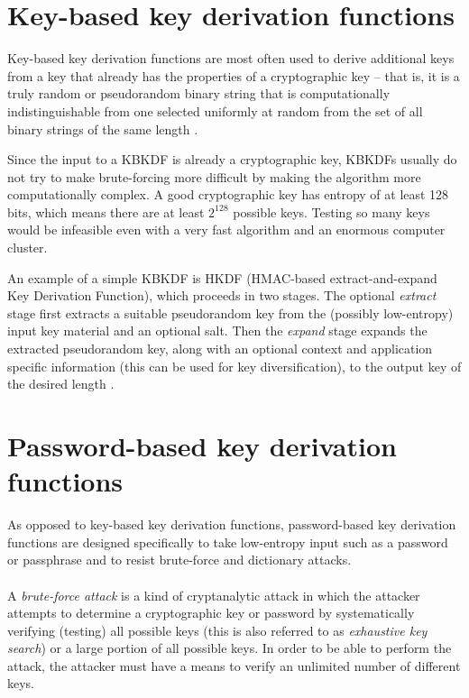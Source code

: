 \documentclass[12pt,oneside]{fithesis2}
\begin{document}
      \section{Key-based key derivation functions}
      Key-based key derivation functions are most often used to derive additional keys from a key that already has the properties of a cryptographic key -- that is, it is a truly random or pseudorandom binary string that is computationally indistinguishable from one selected uniformly at random from the set of all binary strings of the same length \cite{nist:sp800:108}.
      
      Since the input to a KBKDF is already a cryptographic key, KBKDFs usually do not try to make brute-forcing more difficult by making the algorithm more computationally complex. A good cryptographic key has entropy of at least 128 bits, which means there are at least $2^{128}$ possible keys. Testing so many keys would be infeasible even with a very fast algorithm and an enormous computer cluster.
      
      An example of a simple KBKDF is HKDF (HMAC-based extract-and-expand Key Derivation Function), which proceeds in two stages. The optional \emph{extract} stage first extracts a suitable pseudorandom key from the (possibly low-entropy) input key material and an optional salt. Then the \emph{expand} stage expands the extracted pseudorandom key, along with an optional context and application specific information (this can be used for key diversification), to the output key of the desired length \cite{hkdf, rfc5869}.
      
      \section{Password-based key derivation functions}\label{s:PBKDFs}
      As opposed to key-based key derivation functions, password-based key derivation functions are designed specifically to take low-entropy input such as a password or passphrase and to resist brute-force and dictionary attacks.
      
      \paragraph*{}
      A \emph{brute-force attack} is a kind of cryptanalytic attack in which the attacker attempts to determine a cryptographic key or password by systematically verifying (testing) all possible keys (this is also referred to as \emph{exhaustive key search}) \cite{appliedCrypto} or a large portion of all possible keys. In order to be able to perform the attack, the attacker must have a means to verify an unlimited number of different keys.
      
\end{document}
